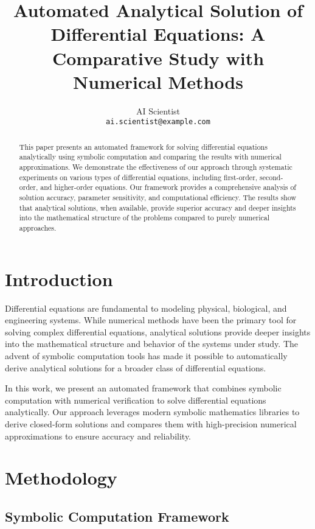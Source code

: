 \documentclass{article} %
\title{Automated Analytical Solution of Differential Equations: A Comparative Study with Numerical Methods}
\author{
  AI Scientist \\
  \texttt{ai.scientist@example.com} \\
}
\begin{document}
\maketitle

\begin{abstract}
This paper presents an automated framework for solving differential equations analytically using symbolic computation and comparing the results with numerical approximations. We demonstrate the effectiveness of our approach through systematic experiments on various types of differential equations, including first-order, second-order, and higher-order equations. Our framework provides a comprehensive analysis of solution accuracy, parameter sensitivity, and computational efficiency. The results show that analytical solutions, when available, provide superior accuracy and deeper insights into the mathematical structure of the problems compared to purely numerical approaches.
\end{abstract}

\section{Introduction}

Differential equations are fundamental to modeling physical, biological, and engineering systems. While numerical methods have been the primary tool for solving complex differential equations, analytical solutions provide deeper insights into the mathematical structure and behavior of the systems under study. The advent of symbolic computation tools has made it possible to automatically derive analytical solutions for a broader class of differential equations.

In this work, we present an automated framework that combines symbolic computation with numerical verification to solve differential equations analytically. Our approach leverages modern symbolic mathematics libraries to derive closed-form solutions and compares them with high-precision numerical approximations to ensure accuracy and reliability.

\section{Methodology}

\subsection{Symbolic Computation Framework}
\end{document}

